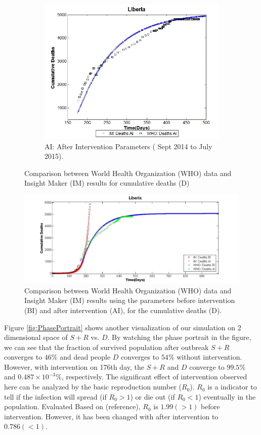 \begin{figure}[h!]
\begin{subfigure}[b]{0.38\textwidth}
 \includegraphics[width=\textwidth]{LB_AI_SD_WHO_IM} \caption{AI: After Intervention Parameters  ( Sept 2014 to July 2015).} \label{fig:LB_AI_SD_WHO_IM} \end{subfigure} 
\caption{Comparison between World Health Organization (WHO) data and Insight Maker (IM) results for cumulative deaths (D)}
\label{fig:LB_IM_WHO} 
\end{figure}



\begin{figure}[!h]
  \centering
  \includegraphics[width=1\textwidth]{LB_Int2_SD_WHO_IM}
  \caption{ Comparison between World Health Organization (WHO) data and Insight Maker (IM) results using the parameters before intervention (BI) and after intervention (AI), for the cumulative deaths (D).}
\label{fig:LB_IM_WHO2} 
\end{figure}


Figure \ref{fig:PhasePortrait} shows another visualization of our simulation on 2 dimensional space of $S+R$ vs. $D$. By watching the phase portrait in the figure, we can see that the fraction of survived population after outbreak $S+R$ converges to $46\%$ and dead people $D$ converges to $54\%$ without intervention. However, with intervention on 176th day, the $S+R$ and $D$ converge to $99.5\%$ and $0.487 \times10^{-3}\%$, respectively. The significant effect of intervention observed here can be analyzed by the basic reproduction number ($R_0$). $R_0$ is a indicator to tell if the infection will spread (if $R_0>1$) or die out (if $R_0<1$) eventually in the population. Evaluated Based on (reference), $R_0$ is $1.99 (>1)$ before intervention. However, it has been changed with after intervention to $0.786(<1)$.


